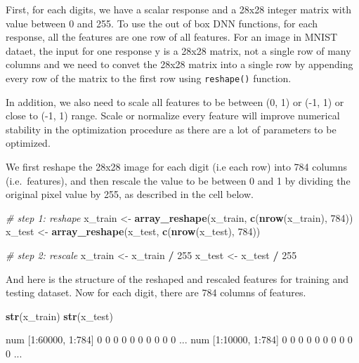 \documentclass[12pt,]{krantz}
\makeatletter
\newenvironment{Shaded}{\begin{snugshade}}{\end{snugshade}}
\newcommand{\CommentTok}[1]{\textcolor[rgb]{0.37,0.37,0.37}{\textit{#1}}}
\newcommand{\DecValTok}[1]{\textcolor[rgb]{0.06,0.06,0.06}{#1}}
\newcommand{\KeywordTok}[1]{\textcolor[rgb]{0.27,0.27,0.27}{\textbf{#1}}}
\newcommand{\NormalTok}[1]{#1}
\newcommand{\OperatorTok}[1]{\textcolor[rgb]{0.43,0.43,0.43}{\textbf{#1}}}
\newcommand{\StringTok}[1]{\textcolor[rgb]{0.5,0.5,0.5}{#1}}
\newenvironment{kframe}{%
\medskip{}
\setlength{\fboxsep}{.8em}
 \def\at@end@of@kframe{}%
 \ifinner\ifhmode%
  \def\at@end@of@kframe{\end{minipage}}%
  \begin{minipage}{\columnwidth}%
 \fi\fi%
 \def\FrameCommand##1{\hskip\@totalleftmargin \hskip-\fboxsep
 \colorbox{shadecolor}{##1}\hskip-\fboxsep
     \hskip-\linewidth \hskip-\@totalleftmargin \hskip\columnwidth}%
 \MakeFramed {\advance\hsize-\width
   \@totalleftmargin\z@ \linewidth\hsize
   \@setminipage}}%
 {\par\unskip\endMakeFramed%
 \at@end@of@kframe}
\renewenvironment{Shaded}{\begin{kframe}}{\end{kframe}}
\makeatother
\begin{document}
First, for each digits, we have a scalar response and a 28x28 integer matrix with value between 0 and 255. To use the out of box DNN functions, for each response, all the features are one row of all features. For an image in MNIST dataet, the input for one response y is a 28x28 matrix, not a single row of many columns and we need to convet the 28x28 matrix into a single row by appending every row of the matrix to the first row using \texttt{reshape()} function.

In addition, we also need to scale all features to be between (0, 1) or (-1, 1) or close to (-1, 1) range. Scale or normalize every feature will improve numerical stability in the optimization procedure as there are a lot of parameters to be optimized.

We first reshape the 28x28 image for each digit (i.e each row) into 784 columns (i.e.~features), and then rescale the value to be between 0 and 1 by dividing the original pixel value by 255, as described in the cell below.

\begin{Shaded}
\begin{Highlighting}[]
\CommentTok{# step 1: reshape}
\NormalTok{x_train <-}\StringTok{ }\KeywordTok{array_reshape}\NormalTok{(x_train, }
                         \KeywordTok{c}\NormalTok{(}\KeywordTok{nrow}\NormalTok{(x_train), }\DecValTok{784}\NormalTok{))}
\NormalTok{x_test <-}\StringTok{ }\KeywordTok{array_reshape}\NormalTok{(x_test, }
                        \KeywordTok{c}\NormalTok{(}\KeywordTok{nrow}\NormalTok{(x_test), }\DecValTok{784}\NormalTok{))}

\CommentTok{# step 2: rescale}
\NormalTok{x_train <-}\StringTok{ }\NormalTok{x_train }\OperatorTok{/}\StringTok{ }\DecValTok{255}
\NormalTok{x_test <-}\StringTok{ }\NormalTok{x_test }\OperatorTok{/}\StringTok{ }\DecValTok{255}
\end{Highlighting}
\end{Shaded}

And here is the structure of the reshaped and rescaled features for training and testing dataset. Now for each digit, there are 784 columns of features.

\begin{Shaded}
\begin{Highlighting}[]
\KeywordTok{str}\NormalTok{(x_train)}
\KeywordTok{str}\NormalTok{(x_test)}
\end{Highlighting}
\end{Shaded}

\begin{Shaded}
\begin{Highlighting}[]
\NormalTok{num [1:60000, 1:784] 0 0 0 0 0 0 0 0 0 0 ...}
\NormalTok{num [1:10000, 1:784] 0 0 0 0 0 0 0 0 0 0 ...}
\end{Highlighting}
\end{Shaded}
\end{document}
